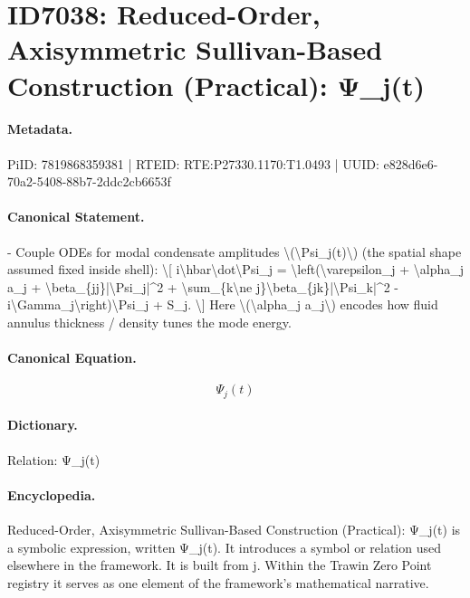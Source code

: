 \section*{ID7038: Reduced-Order, Axisymmetric Sullivan-Based Construction (Practical): Ψ\_j(t)}
\paragraph{Metadata.}
PiID: 7819868359381 | RTEID: RTE:P27330.1170:T1.0493 | UUID: e828d6e6-70a2-5408-88b7-2ddc2cb6653f

\paragraph{Canonical Statement.}
- Couple ODEs for modal condensate amplitudes \textbackslash{}(\textbackslash{}Psi\_j(t)\textbackslash{}) (the spatial shape assumed fixed inside shell): \textbackslash{}[ i\textbackslash{}hbar\textbackslash{}dot\textbackslash{}Psi\_j = \textbackslash{}left(\textbackslash{}varepsilon\_j + \textbackslash{}alpha\_j a\_j + \textbackslash{}beta\_\{jj\}|\textbackslash{}Psi\_j|\textasciicircum{}2 + \textbackslash{}sum\_\{k\textbackslash{}ne j\}\textbackslash{}beta\_\{jk\}|\textbackslash{}Psi\_k|\textasciicircum{}2 - i\textbackslash{}Gamma\_j\textbackslash{}right)\textbackslash{}Psi\_j + S\_j. \textbackslash{}] Here \textbackslash{}(\textbackslash{}alpha\_j a\_j\textbackslash{}) encodes how fluid annulus thickness / density tunes the mode energy.

\paragraph{Canonical Equation.}
\[
\Psi_j(t)
\]

\paragraph{Dictionary.}
Relation: Ψ\_j(t)

\paragraph{Encyclopedia.}
Reduced-Order, Axisymmetric Sullivan-Based Construction (Practical): Ψ\_j(t) is a symbolic expression, written Ψ\_j(t). It introduces a symbol or relation used elsewhere in the framework. It is built from j. Within the Trawin Zero Point registry it serves as one element of the framework's mathematical narrative.
